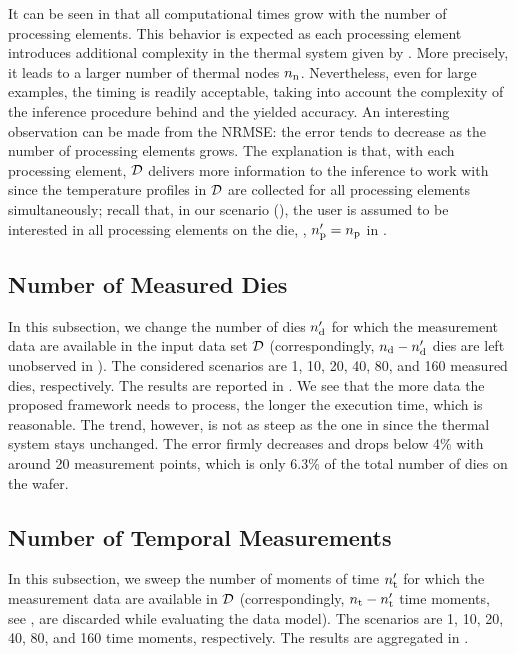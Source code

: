 It can be seen in  that all computational times grow with the number of processing elements. This behavior is expected as each processing element introduces additional complexity in the thermal system given by . More precisely, it leads to a larger number of thermal nodes ${n_\text{n}}$. Nevertheless, even for large examples, the timing is readily acceptable, taking into account the complexity of the inference procedure behind and the yielded accuracy.
An interesting observation can be made from the NRMSE: the error tends to decrease as the number of processing elements grows. The explanation is that, with each processing element, $\mathcal{D}$ delivers more information to the inference to work with since the temperature profiles in $\mathcal{D}$ are collected for all processing elements simultaneously; recall that, in our scenario (), the user is assumed to be interested in all processing elements on the die, \ie, ${n_\text{p}'} = {n_\text{p}}$ in .

\subsection{Number of Measured Dies}
In this subsection, we change the number of dies ${n_\text{d}'}$ for which the measurement data are available in the input data set $\mathcal{D}$ (correspondingly, ${n_\text{d}} - {n_\text{d}'}$ dies are left unobserved in ). The considered scenarios are 1, 10, 20, 40, 80, and 160 measured dies, respectively. The results are reported in .
We see that the more data the proposed framework needs to process, the longer the execution time, which is reasonable. The trend, however, is not as steep as the one in  since the thermal system stays unchanged.
The error firmly decreases and drops below 4\% with around 20 measurement points, which is only 6.3\% of the total number of dies on the wafer.

\subsection{Number of Temporal Measurements}
In this subsection, we sweep the number of moments of time ${n_\text{t}'}$ for which the measurement data are available in $\mathcal{D}$ (correspondingly, ${n_\text{t}} - {n_\text{t}'}$ time moments, see , are discarded while evaluating the data model). The scenarios are 1, 10, 20, 40, 80, and 160 time moments, respectively. The results are aggregated in .

